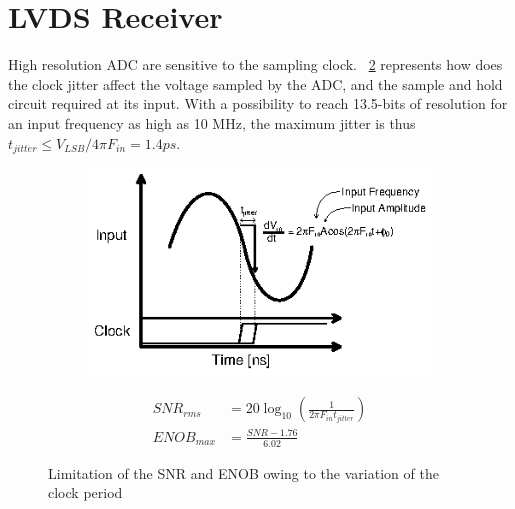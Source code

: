 \section{LVDS Receiver}
High resolution ADC are sensitive to the sampling clock. \figurename~\ref{fig:adc-jitter} represents how does the clock jitter affect the voltage sampled by the ADC, and the sample and hold circuit required at its input. With a possibility to reach 13.5-bits of resolution for an input frequency as high as 10 MHz, the maximum jitter is thus $t_{jitter} \leq V_{LSB}/4\pi F_{in} = 1.4 ps$. 

\begin{figure}[htp]
    \centering
    \begin{subfigure}[b]{0.48\textwidth}
        \includegraphics[width=\textwidth]{Chapter5/Figs/lvds/aperture_jitter.ps}
        \label{}
    \end{subfigure}
    \begin{subfigure}[b]{0.48\textwidth}
        \begin{align}
            SNR_{rms}  &= 20\log_{10}\left(\frac{1}{2\pi F_{in}t_{jitter}} \right) \\
            ENOB_{max} &= \frac{SNR-1.76}{6.02} 
        \end{align}
        \vspace{2em}
    \end{subfigure}
    \caption{Limitation of the SNR and ENOB owing to the variation of the clock period}
    \label{fig:adc-jitter}
\end{figure}

